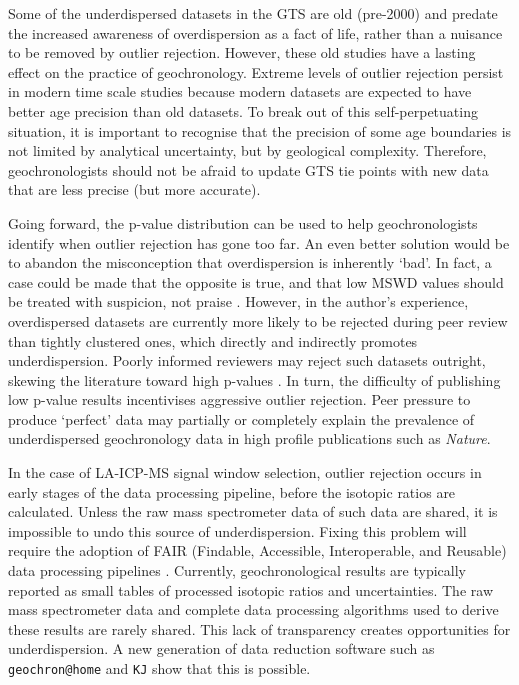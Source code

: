 \documentclass[gchron, manuscript]{copernicus}
\begin{document}
Some of the underdispersed datasets in the GTS are old (pre-2000) and
predate the increased awareness of overdispersion as a fact of life,
rather than a nuisance to be removed by outlier rejection. However,
these old studies have a lasting effect on the practice of
geochronology.  Extreme levels of outlier rejection persist in modern
time scale studies because modern datasets are expected to have better
age precision than old datasets. To break out of this
self-perpetuating situation, it is important to recognise that the
precision of some age boundaries is not limited by analytical
uncertainty, but by geological complexity. Therefore, geochronologists
should not be afraid to update GTS tie points with new data that are
less precise (but more accurate).\medskip

Going forward, the p-value distribution can be used to help
geochronologists identify when outlier rejection has gone too far.  An
even better solution would be to abandon the misconception that
overdispersion is inherently `bad'. In fact, a case could be made that
the opposite is true, and that low MSWD values should be treated with
suspicion, not praise \citep{vermeesch2025c}. However, in the author's
experience, overdispersed datasets are currently more likely to be
rejected during peer review than tightly clustered ones, which
directly and indirectly promotes underdispersion.  Poorly informed
reviewers may reject such datasets outright, skewing the literature
toward high p-values \citep[publication bias;][]{ioannidis2005}.  In
turn, the difficulty of publishing low p-value results incentivises
aggressive outlier rejection.  Peer pressure to produce `perfect' data
may partially or completely explain the prevalence of underdispersed
geochronology data in high profile publications such as
\emph{Nature}.\medskip

In the case of LA-ICP-MS signal window selection, outlier rejection
occurs in early stages of the data processing pipeline, before the
isotopic ratios are calculated. Unless the raw mass spectrometer data
of such data are shared, it is impossible to undo this source of
underdispersion. Fixing this problem will require the adoption of FAIR
(Findable, Accessible, Interoperable, and Reusable) data processing
pipelines \citep{wilkinson2016}.  Currently, geochronological results
are typically reported as small tables of processed isotopic ratios
and uncertainties. The raw mass spectrometer data and complete data
processing algorithms used to derive these results are rarely
shared. This lack of transparency creates opportunities for
underdispersion.  A new generation of data reduction software such as
\texttt{geochron@home} \citep{vermeesch2026} and \texttt{KJ}
\citep{vermeeschKJ} show that this is possible.\medskip
\end{document}
